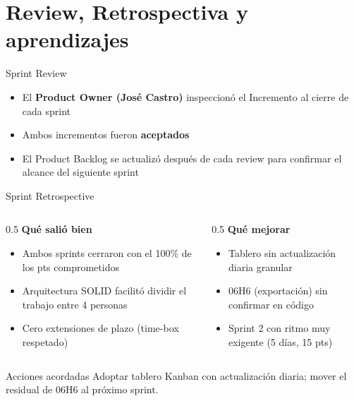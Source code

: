 \documentclass[11pt,aspectratio=169]{beamer}
\begin{document}
\section{Review, Retrospectiva y aprendizajes}

\begin{frame}{Sprint Review}
  \begin{itemize}
    \item El \textbf{Product Owner (José Castro)} inspeccionó el Incremento al cierre de cada sprint
    \item Ambos incrementos fueron \textbf{aceptados}
    \item El Product Backlog se actualizó después de cada review para confirmar el alcance del
          siguiente sprint
  \end{itemize}
\end{frame}

\begin{frame}{Sprint Retrospective}
  \begin{columns}[T]
    \begin{column}{0.5\textwidth}
      \textbf{\textcolor{epngreen}{Qué salió bien}}
      \begin{itemize}
        \item Ambos sprints cerraron con el 100\% de los pts comprometidos
        \item Arquitectura SOLID facilitó dividir el trabajo entre 4 personas
        \item Cero extensiones de plazo (time-box respetado)
      \end{itemize}
    \end{column}
    \begin{column}{0.5\textwidth}
      \textbf{\textcolor{epnamber}{Qué mejorar}}
      \begin{itemize}
        \item Tablero sin actualización diaria granular
        \item 06H6 (exportación) sin confirmar en código
        \item Sprint 2 con ritmo muy exigente (5 días, 15 pts)
      \end{itemize}
    \end{column}
  \end{columns}
  \vspace{0.3cm}
  \begin{exampleblock}{Acciones acordadas}
    Adoptar tablero Kanban con actualización diaria; mover el residual de 06H6 al próximo sprint.
  \end{exampleblock}
\end{frame}
\end{document}
